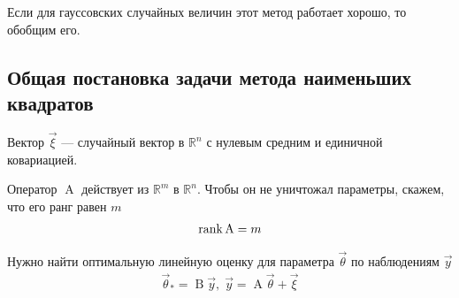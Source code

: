 Если для гауссовских случайных величин этот метод работает хорошо, то обобщим
его.

\subsection{Общая постановка задачи метода наименьших квадратов}

Вектор $\vec{\xi}$ --- случайный вектор в $\mathbb{R}^n$ с нулевым средним и
единичной ковариацией.

Оператор $\operatorname{A}$ действует из $\mathbb{R}^m$ в $\mathbb{R}^n$. Чтобы
он не уничтожал параметры, скажем, что его ранг равен $m$
\begin{align*}
    \operatorname{rank}{\operatorname{A}} = m
\end{align*}

Нужно найти оптимальную линейную оценку для параметра $\vec{\theta}$ по
наблюдениям $\vec{y}$
\begin{align*}
    \vec{\theta}_* = \operatorname{B} \vec{y},\;
        \vec{y} = \operatorname{A} \vec{\theta} + \vec{\xi}
\end{align*}

